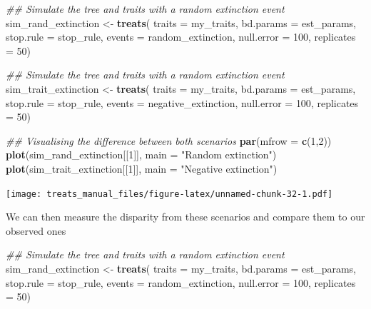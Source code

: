 \documentclass[
]{book}
\newenvironment{Shaded}{\begin{snugshade}}{\end{snugshade}}
\newcommand{\CommentTok}[1]{\textcolor[rgb]{0.56,0.35,0.01}{\textit{#1}}}
\newcommand{\DataTypeTok}[1]{\textcolor[rgb]{0.13,0.29,0.53}{#1}}
\newcommand{\DecValTok}[1]{\textcolor[rgb]{0.00,0.00,0.81}{#1}}
\newcommand{\KeywordTok}[1]{\textcolor[rgb]{0.13,0.29,0.53}{\textbf{#1}}}
\newcommand{\NormalTok}[1]{#1}
\newcommand{\StringTok}[1]{\textcolor[rgb]{0.31,0.60,0.02}{#1}}
\begin{document}
\begin{Shaded}
\begin{Highlighting}[]
\CommentTok{\#\# Simulate the tree and traits with a random extinction event}
\NormalTok{sim\_rand\_extinction \textless{}{-}}\StringTok{ }\KeywordTok{treats}\NormalTok{(}
                   \DataTypeTok{traits     =}\NormalTok{ my\_traits,}
                   \DataTypeTok{bd.params  =}\NormalTok{ est\_params,}
                   \DataTypeTok{stop.rule  =}\NormalTok{ stop\_rule,}
                   \DataTypeTok{events     =}\NormalTok{ random\_extinction,}
                   \DataTypeTok{null.error =} \DecValTok{100}\NormalTok{,}
                   \DataTypeTok{replicates =} \DecValTok{50}\NormalTok{)}

\CommentTok{\#\# Simulate the tree and traits with a random extinction event}
\NormalTok{sim\_trait\_extinction \textless{}{-}}\StringTok{ }\KeywordTok{treats}\NormalTok{(}
                   \DataTypeTok{traits     =}\NormalTok{ my\_traits,}
                   \DataTypeTok{bd.params  =}\NormalTok{ est\_params,}
                   \DataTypeTok{stop.rule  =}\NormalTok{ stop\_rule,}
                   \DataTypeTok{events     =}\NormalTok{ negative\_extinction,}
                   \DataTypeTok{null.error =} \DecValTok{100}\NormalTok{,}
                   \DataTypeTok{replicates =} \DecValTok{50}\NormalTok{)}

\CommentTok{\#\# Visualising the difference between both scenarios}
\KeywordTok{par}\NormalTok{(}\DataTypeTok{mfrow =} \KeywordTok{c}\NormalTok{(}\DecValTok{1}\NormalTok{,}\DecValTok{2}\NormalTok{))}
\KeywordTok{plot}\NormalTok{(sim\_rand\_extinction[[}\DecValTok{1}\NormalTok{]], }\DataTypeTok{main =} \StringTok{"Random extinction"}\NormalTok{)}
\KeywordTok{plot}\NormalTok{(sim\_trait\_extinction[[}\DecValTok{1}\NormalTok{]], }\DataTypeTok{main =} \StringTok{"Negative extinction"}\NormalTok{)}
\end{Highlighting}
\end{Shaded}

\texttt{[image: treats\_manual\_files/figure-latex/unnamed-chunk-32-1.pdf]}

We can then measure the disparity from these scenarios and compare them to our observed ones

\begin{Shaded}
\begin{Highlighting}[]
\CommentTok{\#\# Simulate the tree and traits with a random extinction event}
\NormalTok{sim\_rand\_extinction \textless{}{-}}\StringTok{ }\KeywordTok{treats}\NormalTok{(}
                   \DataTypeTok{traits     =}\NormalTok{ my\_traits,}
                   \DataTypeTok{bd.params  =}\NormalTok{ est\_params,}
                   \DataTypeTok{stop.rule  =}\NormalTok{ stop\_rule,}
                   \DataTypeTok{events     =}\NormalTok{ random\_extinction,}
                   \DataTypeTok{null.error =} \DecValTok{100}\NormalTok{,}
                   \DataTypeTok{replicates =} \DecValTok{50}\NormalTok{)}
\end{Highlighting}
\end{Shaded}
\end{document}
